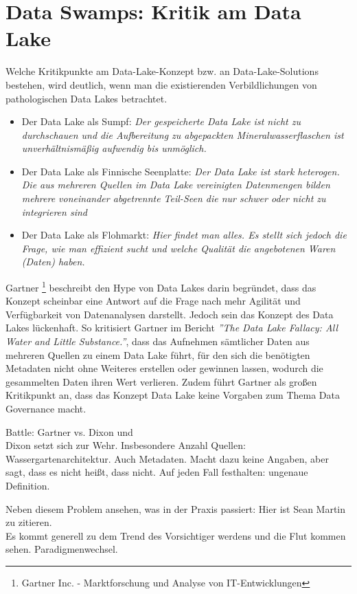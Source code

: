 \documentclass[twoside,twocolumn]{article}
\begin{document}
\section{Data Swamps: Kritik am Data Lake}
Welche Kritikpunkte am Data-Lake-Konzept bzw. an Data-Lake-Solutions bestehen, wird deutlich, wenn man die existierenden Verbildlichungen von pathologischen Data Lakes betrachtet.
\begin{itemize}
	\item Der Data Lake als Sumpf: \textit{Der gespeicherte Data Lake ist nicht zu durchschauen und die Aufbereitung zu abgepackten Mineralwasserflaschen ist unverhältnismäßig aufwendig bis unmöglich.\cite{src3}}
	\item Der Data Lake als Finnische Seenplatte:  \textit{Der Data Lake ist stark heterogen. Die aus mehreren Quellen im Data Lake vereinigten Datenmengen bilden mehrere voneinander abgetrennte Teil-Seen die nur schwer oder nicht zu integrieren sind\cite{src13}} 
	\item Der Data Lake als Flohmarkt: \textit{Hier findet man alles. Es stellt sich jedoch die Frage, wie man effizient sucht und welche Qualität die angebotenen Waren (Daten) haben.\cite{src12}} 
\end{itemize}

Gartner \footnote{Gartner Inc. - Marktforschung und Analyse von IT-Entwicklungen} beschreibt den Hype von Data Lakes darin begründet, dass das Konzept scheinbar eine Antwort auf die Frage nach mehr Agilität und Verfügbarkeit von Datenanalysen darstellt. Jedoch sein das Konzept des Data Lakes lückenhaft. So kritisiert Gartner im Bericht \textit{''The Data Lake Fallacy: All Water and Little Substance.''}, dass das Aufnehmen sämtlicher Daten aus mehreren Quellen zu einem Data Lake führt, für den sich die benötigten Metadaten nicht ohne Weiteres erstellen oder gewinnen lassen, wodurch die gesammelten Daten ihren Wert verlieren. Zudem führt Gartner als großen Kritikpunkt an, dass das Konzept Data Lake keine Vorgaben zum Thema Data Governance macht.\cite{src3}

Battle: Gartner vs. Dixon und \\
Dixon setzt sich zur Wehr. Insbesondere Anzahl Quellen: Wassergartenarchitektur.\cite{src15} Auch Metadaten. Macht dazu keine Angaben, aber sagt, dass es nicht heißt, dass nicht.\cite{src14} Auf jeden Fall festhalten: ungenaue Definition.\

Neben diesem Problem ansehen, was in der Praxis passiert: Hier ist Sean Martin zu zitieren.\\
Es kommt generell zu dem Trend des Vorsichtiger werdens und die Flut kommen sehen. Paradigmenwechsel.\cite{src1}
\end{document}
